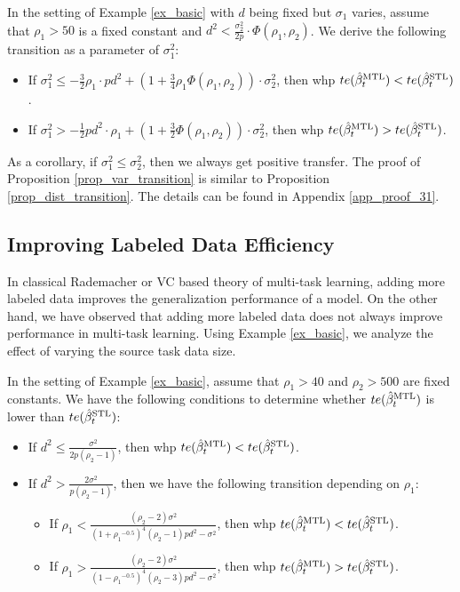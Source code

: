\begin{proposition}\label{prop_var_transition}
	In the setting of Example \ref{ex_basic} with $d$ being fixed but $\sigma_1$ varies, assume that $\rho_1 > 50$ is a fixed constant and $d^2 < \frac {\sigma_2^2} {2p} \cdot \Phi(\rho_1, \rho_2)$.
	We derive the following transition as a parameter of $\sigma_1^2$:
	\begin{itemize}
		\item If $\sigma_1^2 \le -\frac32 \rho_1 \cdot p d^2+\left(1+ \frac34\rho_1 \Phi(\rho_1, \rho_2)\right)\cdot\sigma_2^2$, then whp $te(\hat{\beta}_t^{\text{MTL}}) < te(\hat{\beta}_t^{\text{STL}})$.
		\item If $\sigma_1^2 > - \frac12p d^2 \cdot \rho_1 +\left(1+ \frac32\Phi(\rho_1, \rho_2)\right) \cdot \sigma_2^2$, then whp $te(\hat{\beta}_t^{\text{MTL}}) > te(\hat{\beta}_t^{\text{STL}})$.
	\end{itemize}
\end{proposition}
As a corollary, if $\sigma_1^2 \le \sigma_2^2$, then we always get positive transfer.
The proof of Proposition \ref{prop_var_transition} is similar to Proposition \ref{prop_dist_transition}.
The details can be found in Appendix \ref{app_proof_31}.


\subsection{Improving Labeled Data Efficiency}\label{sec_data_size}

In classical Rademacher or VC based theory of multi-task learning, adding more labeled data improves the generalization performance of a model.
On the other hand, we have observed that adding more labeled data does not always improve performance in multi-task learning.
Using Example \ref{ex_basic}, we analyze the effect of varying the source task data size.

\begin{proposition}\label{prop_data_size}
	In the setting of Example \ref{ex_basic}, assume that $\rho_1 > 40$ and $\rho_2 > 500$ are fixed constants.
	We have the following conditions to determine whether $te(\hat{\beta}_t^{\text{MTL}})$ is lower than $te(\hat{\beta}_t^{\text{STL}})$:
	\begin{itemize}
\item If $d^2 \le \frac{\sigma^2}{2p(\rho_2-1)}$, then whp $te(\hat{\beta}_t^{\text{MTL}}) < te(\hat{\beta}_t^{\text{STL}})$.
		 
\item If $d^2 > \frac{2\sigma^2}{p (\rho_2 - 1)}$, then we have the following transition depending on $\rho_1$:
		\begin{itemize}
			\item If $\rho_1 < \frac{(\rho_2-2)\sigma^2}{(1 + {\rho_1}^{-0.5})^4(\rho_2 - 1) pd^2 - \sigma^2}$, then whp $te(\hat{\beta}_t^{\text{MTL}}) < te(\hat{\beta}_t^{\text{STL}})$.
			\item If $\rho_1 > \frac{(\rho_2-2) \sigma^2}{(1 - {\rho_1}^{-0.5})^4 (\rho_2 - 3) pd^2 - \sigma^2}$, then whp $te(\hat{\beta}_t^{\text{MTL}}) > te(\hat{\beta}_t^{\text{STL}})$.
		\end{itemize}
	\end{itemize}
\end{proposition}

